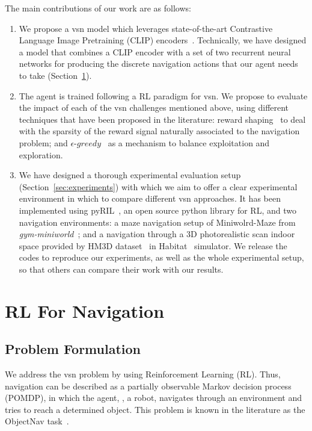 The main contributions of our work are as follows:
\begin{enumerate}
 \item We propose a \acrshort{vsn} model which leverages state-of-the-art Contrastive Language Image Pretraining (CLIP) encoders~\cite{radford2021}.
Technically, we have designed a model that combines a CLIP encoder with a set of two recurrent neural networks for producing the discrete navigation actions that our agent needs to take (Section~\ref{sec:navigation}).
  \item The agent is trained following a RL paradigm for \acrshort{vsn}. We propose to evaluate the impact of each of the \acrshort{vsn} challenges mentioned above, using different techniques that have been proposed in the literature: reward shaping~\cite{sutton2018, wijmans2020} to deal with the sparsity of the reward signal naturally associated to the navigation problem; and $\epsilon\text{-}greedy$~\cite{mnih2013} as a mechanism to balance exploitation and exploration.
  \item We have designed a thorough experimental evaluation setup (Section~\ref{sec:experiments}) with which we aim to offer a clear experimental environment in which to compare different \acrshort{vsn} approaches.
 It has been implemented using pyRIL~\cite{pyRIL}, an open source python library for RL, and two navigation environments: a maze navigation setup of Miniwolrd-Maze from \textit{gym-miniworld}~\cite{gym_miniworld}; and a navigation through a 3D photorealistic scan indoor space provided by HM3D dataset~\cite{ramakrishnan2021} in Habitat~\cite{szot2021} simulator.
 We release the codes to reproduce our experiments, as well as the whole experimental setup, so that others can compare their work with our results.
\end{enumerate}

\section{RL For Navigation}\label{sec:navigation}

\subsection{Problem Formulation}\label{subsec:problem-formulation}

We address the \acrshort{vsn} problem by using Reinforcement Learning (RL).
Thus, navigation can be described as a partially observable Markov decision process (POMDP), in which the agent, \ie, a robot, navigates through an environment and tries to reach a determined object.
This problem is known in the literature as the ObjectNav task~\cite{batra2020}.


